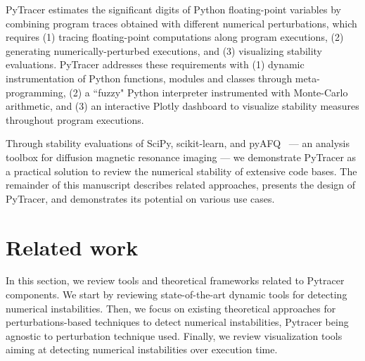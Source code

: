 \documentclass[11pt]{article}
\newcommand{\tristan}[1]{\color{orange}\textbf{From Tristan:}#1\color{black}}
\begin{document}
PyTracer estimates the significant digits of Python floating-point variables by combining program traces obtained with different numerical perturbations, which requires (1) tracing floating-point computations along program executions, (2) generating numerically-perturbed executions, and (3) visualizing stability evaluations. PyTracer addresses these requirements with (1) dynamic instrumentation of Python functions, modules and classes through meta-programming, (2) a ``fuzzy" Python interpreter instrumented with Monte-Carlo arithmetic, and (3) an interactive Plotly dashboard to visualize stability measures throughout program executions.

Through stability evaluations of 
SciPy, scikit-learn, and pyAFQ~\cite{kruper2021evaluating} --- an analysis toolbox for diffusion magnetic resonance imaging --- we demonstrate PyTracer as a practical solution to review the numerical stability of extensive code bases. The remainder of this manuscript describes related approaches, presents the design of PyTracer, and demonstrates its potential on various use cases.


\section{Related work}

In this section, we review tools and theoretical frameworks related to Pytracer components.
We start by reviewing state-of-the-art dynamic tools for detecting numerical instabilities.
Then, we focus on existing theoretical approaches for perturbations-based techniques to detect numerical instabilities,
Pytracer being agnostic to perturbation technique used. Finally, we review visualization tools 
aiming at detecting numerical instabilities over execution time.
\end{document}

